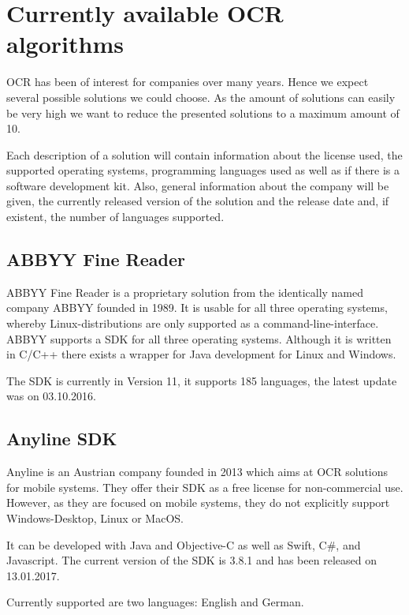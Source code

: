 \section{Currently available OCR algorithms}
\label{sec3.1}

OCR has been of interest for companies over many years. Hence we expect several possible solutions we could choose. As the amount of solutions can easily be very high we want to reduce the presented solutions to a maximum amount of 10.

Each description of a solution will contain information about the license used, the supported operating systems, programming languages used as well as if there is a software development kit. Also, general information about the company will be given, the currently released version of the solution and the release date and, if existent, the number of languages supported.

\subsection{ABBYY Fine Reader}
\label{sec3.1.1}

ABBYY Fine Reader is a proprietary solution from the identically named company ABBYY founded in 1989. It is usable for all three operating systems, whereby Linux-distributions are only supported as a command-line-interface. ABBYY supports a SDK for all three operating systems. Although it is written in C/C++ there exists a wrapper for Java development for Linux and Windows\cite{abbyy16}. 

The SDK is currently in Version 11, it supports 185 languages, the latest update was on 03.10.2016.

\subsection{Anyline SDK}
\label{sec3.1.2}

Anyline is an Austrian company founded in 2013 which aims at OCR solutions for mobile systems. They offer their SDK as a free license for non-commercial use. However, as they are focused on mobile systems, they do not explicitly support Windows-Desktop, Linux or MacOS.

It can be developed with Java and Objective-C as well as Swift, C\#, and Javascript. The current version of the SDK is 3.8.1 and has been released on 13.01.2017.

Currently supported are two languages: English and German.

